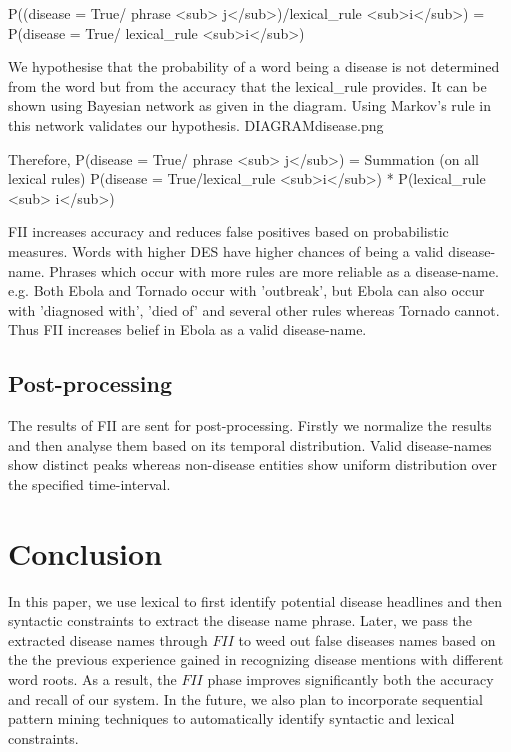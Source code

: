 \documentclass{article}
\begin{document}
  P((disease = True/ phrase <sub> j</sub>)/lexical_rule <sub>i</sub>) = P(disease = True/ lexical_rule <sub>i</sub>)

We hypothesise that the probability of a word being a disease is not determined from the word but from the accuracy that the lexical_rule provides.
It can be shown using Bayesian network as given in the diagram. Using Markov's rule in this network validates our hypothesis. 
DIAGRAM{disease.png}

Therefore, P(disease = True/ phrase <sub> j</sub>) = Summation (on all lexical rules) P(disease = True/lexical_rule <sub>i</sub>) * P(lexical_rule <sub> i</sub>)

FII increases accuracy and reduces false positives based on probabilistic measures. Words with higher DES have higher chances of being a valid disease-name. Phrases which occur with more rules are more reliable as a disease-name. 
e.g. Both Ebola and Tornado occur with 'outbreak', but Ebola can also occur with 'diagnosed with', 'died of' and several other rules whereas Tornado cannot. Thus FII increases belief in Ebola as a valid disease-name. 

\subsection{Post-processing}
The results of FII are sent for post-processing. Firstly we normalize the results and then analyse them based on its temporal distribution. Valid disease-names show distinct peaks whereas non-disease entities show uniform distribution over the specified time-interval. 


\section{Conclusion}
In this paper, we use lexical to first identify potential disease headlines and then syntactic constraints to extract the disease name phrase. Later, we pass the extracted disease names through $FII$ to weed out false diseases names based on the the previous experience gained in recognizing disease mentions with different word roots. As a result, the $FII$ phase improves significantly both the accuracy and recall of our system. In the future, we also plan to incorporate sequential pattern mining techniques to automatically identify syntactic and lexical constraints.  


\end{document}
